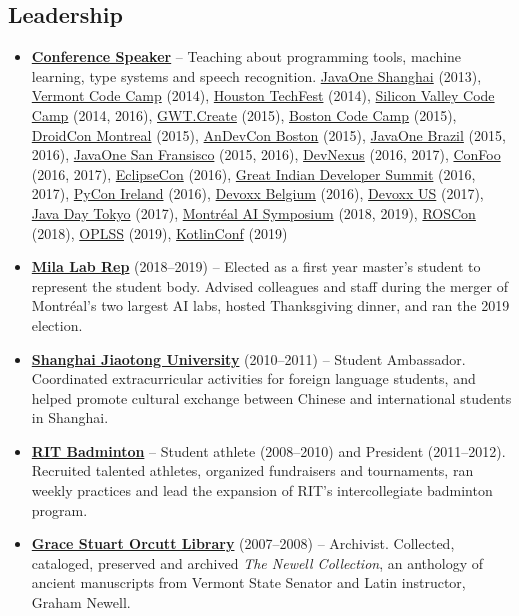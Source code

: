 \documentclass[letterpaper,11pt]{article}
\newcommand{\resumeItem}[2]{
  \item\small{\textbf{#1}{ #2 }}
}
\newcommand{\resumeSubItem}[2]{\resumeItem{#1}{#2}}
\newcommand{\resumeSubHeadingListStart}{\begin{itemize}[leftmargin=*]}
\newcommand{\resumeSubHeadingListEnd}{\end{itemize}}
\begin{document}
\begin{justify}
\section{Leadership}
\resumeSubHeadingListStart
\resumeSubItem{\href{https://speakerdeck.com/breandan}{Conference Speaker}} {-- Teaching about programming tools, machine learning, type systems and speech recognition.
\href{https://oracle.com/javaone}{JavaOne Shanghai} (2013),
\href{https://www.vtcodecamp.org/}{Vermont Code Camp} (2014),
\href{http://houstontechfest.com/}{Houston TechFest} (2014),
\href{https://svcc.mobi/}{Silicon Valley Code Camp} (2014, 2016),
\href{http://gwtcreate.com/}{GWT.Create} (2015),
\href{https://www.bostoncodecamp.com/}{Boston Code Camp} (2015),
\href{https://www.droidcon.com/}{DroidCon Montreal} (2015),
\href{http://www.andevcon.com/}{AnDevCon Boston} (2015),
\href{https://oracle.com/javaone}{JavaOne Brazil} (2015, 2016),
\href{https://oracle.com/javaone}{JavaOne San Fransisco} (2015, 2016),
\href{https://devnexus.com/}{DevNexus} (2016, 2017),
\href{https://confoo.ca}{ConFoo} (2016, 2017),
\href{https://www.eclipsecon.org/na2016}{EclipseCon} (2016),
\href{https://www.developersummit.com/}{Great Indian Developer Summit} (2016, 2017),
\href{https://python.ie}{PyCon Ireland} (2016),
\href{https://devoxx.com/}{Devoxx Belgium} (2016),
\href{https://devoxx.com/}{Devoxx US} (2017),
\href{https://www.oracle.co.jp/events/javaday/2017/}{Java Day Tokyo} (2017),
\href{http://montrealaisymposium.com/}{Montr\'eal AI Symposium} (2018, 2019),
\href{https://roscon.ros.org}{ROSCon} (2018),
\href{https://www.cs.uoregon.edu/research/summerschool/summer19/topics.php}{OPLSS} (2019),
\href{https://kotlinconf.com/}{KotlinConf} (2019)
}
\resumeSubItem{\href{https://mila.quebec/}{Mila Lab Rep}} {(2018--2019) -- Elected as a first year master's student to represent the student body. Advised colleagues and staff during the merger of Montr\'eal's two largest AI labs, hosted Thanksgiving dinner, and ran the 2019 election.}
\resumeSubItem{\href{https://www.sjtu.edu.cn/}{Shanghai Jiaotong University}} {(2010--2011) -- Student Ambassador. Coordinated extracurricular activities for foreign language students, and helped promote cultural exchange between Chinese and international students in Shanghai.}
\resumeSubItem{\href{https://www.rit.edu/sg/badminton/}{RIT Badminton}} {-- Student athlete (2008--2010) and President (2011--2012). Recruited talented athletes, organized fundraisers and tournaments, ran weekly practices and lead the expansion of RIT's intercollegiate badminton program.}
\resumeSubItem{\href{https://www.stjacademy.org/academics/library}{Grace Stuart Orcutt Library}} {(2007--2008) -- Archivist. Collected, cataloged, preserved and archived \textit{The Newell Collection}, an anthology of ancient manuscripts from Vermont State Senator and Latin instructor, Graham Newell.}
\resumeSubHeadingListEnd


\end{justify}
\end{document}
